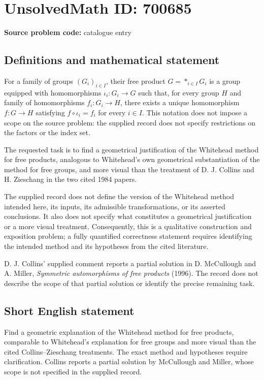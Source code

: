 \documentclass[11pt]{article}
\begin{document}
\section*{UnsolvedMath ID: 700685}
\textbf{Source problem code:} catalogue entry
\subsection{Definitions and mathematical statement}
For a family of groups \((G_i)_{i\in I}\), their free product \(G=\mathop{\ast}_{i\in I}G_i\) is a group equipped with homomorphisms \(\iota_i:G_i\to G\) such that, for every group \(H\) and family of homomorphisms \(f_i:G_i\to H\), there exists a unique homomorphism \(f:G\to H\) satisfying \(f\circ\iota_i=f_i\) for every \(i\in I\). This notation does not impose a scope on the source problem: the supplied record does not specify restrictions on the factors or the index set.

The requested task is to find a geometrical justification of the Whitehead method for free products, analogous to Whitehead's own geometrical substantiation of the method for free groups, and more visual than the treatment of D. J. Collins and H. Zieschang in the two cited 1984 papers.

The supplied record does not define the version of the Whitehead method intended here, its inputs, its admissible transformations, or its asserted conclusions. It also does not specify what constitutes a geometrical justification or a more visual treatment. Consequently, this is a qualitative construction and exposition problem; a fully quantified correctness statement requires identifying the intended method and its hypotheses from the cited literature.

D. J. Collins' supplied comment reports a partial solution in D. McCullough and A. Miller, \emph{Symmetric automorphisms of free products} (1996). The record does not describe the scope of that partial solution or identify the precise remaining task.
\subsection{Short English statement}
Find a geometric explanation of the Whitehead method for free products, comparable to Whitehead's explanation for free groups and more visual than the cited Collins--Zieschang treatments. The exact method and hypotheses require clarification. Collins reports a partial solution by McCullough and Miller, whose scope is not specified in the supplied record.
\end{document}
